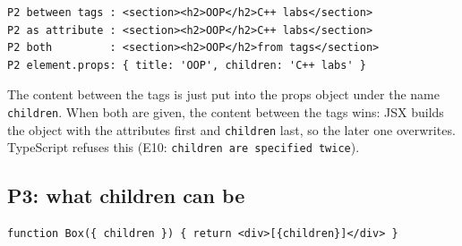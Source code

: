 \documentclass[
  10pt,
]{article}
\begin{document}
\begin{verbatim}
P2 between tags : <section><h2>OOP</h2>C++ labs</section>
P2 as attribute : <section><h2>OOP</h2>C++ labs</section>
P2 both         : <section><h2>OOP</h2>from tags</section>
P2 element.props: { title: 'OOP', children: 'C++ labs' }
\end{verbatim}

The content between the tags is just put into the props object under the
name \texttt{children}. When both are given, the content between the
tags wins: JSX builds the object with the attributes first and
\texttt{children} last, so the later one overwrites. TypeScript refuses
this (E10:
\texttt{\allowbreak{}\textquotesingle{}children\allowbreak{}\textquotesingle{}\ are\ specified\ twice}).

\hypertarget{p3-what-children-can-be}{%
\subsection{P3: what children can be}\label{p3-what-children-can-be}}

\begin{verbatim}
function Box({ children }) { return <div>[{children}]</div> }
\end{verbatim}
\end{document}
